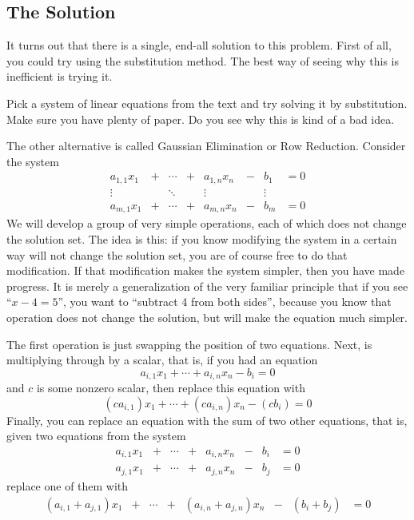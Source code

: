 \documentclass[Main.tex]{subfiles}
\begin{document}
\subsection{The Solution}

It turns out that there is a single, end-all solution to this problem. 
First of all, you could try using the substitution method.  
The best way of seeing why this is inefficient is trying it.
\begin{UnimpEx}
  Pick a system of linear equations from the text and try solving it by substitution.
  Make sure you have plenty of paper.  
  Do you see why this is kind of a bad idea.
\end{UnimpEx}
The other alternative is called Gaussian Elimination or Row Reduction.  
Consider the system
\[\begin{array}{ccccccccc}
  a_{1,1}x_1 & + & \cdots & + & a_{1,n}x_n & - & b_1 & = 0\\
  \vdots     &   & \ddots &   & \vdots     &   & \vdots\\
  a_{m,1}x_1 & + & \cdots & + & a_{m,n}x_n & - & b_m & = 0
\end{array}\]
We will develop a group of very simple operations, each of which does not change the solution set.  
The idea is this:
if you know modifying the system in a certain way will not change the solution set, you are of course free to do that modification.
If that modification makes the system simpler, then you have made progress.  
It is merely a generalization of the very familiar principle that if you see ``$x-4=5$'', you want to ``subtract 4 from both sides'', because you know that operation does not change the solution, but will make the equation much simpler.  

The first operation is just swapping the position of two equations.  
Next, is multiplying through by a scalar, that is, if you had an equation
\[a_{i,1}x_1 + \cdots + a_{i,n}x_n - b_i  = 0\]
and $c$ is some nonzero scalar, then replace this equation with
\[(ca_{i,1})x_1 + \cdots + (ca_{i,n})x_n - (cb_i)  = 0\]
Finally, you can replace an equation with the sum of two other equations, that is, given two equations from the system
\[\begin{array}{ccccccccc}
  a_{i,1}x_1 & + & \cdots & + & a_{i,n}x_n & - & b_i & = 0\\
  a_{j,1}x_1 & + & \cdots & + & a_{j,n}x_n & - & b_j & = 0
\end{array}\]
replace one of them with
\[\begin{array}{ccccccccc}
  (a_{i,1} + a_{j,1})x_1 & + & \cdots & + & (a_{i,n} + a_{j,n})x_n & - & (b_i + b_j) & = 0
\end{array}\]
\end{document}
